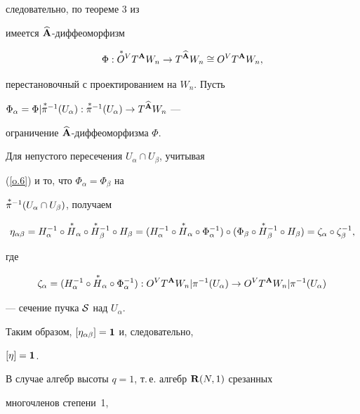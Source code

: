 \begin{pf}
следовательно, по теореме 3 из \cite{VSh35}


имеется $\widehat{{\bold A}}$-диффеоморфизм


$$


\Phi:{\puts O}{}^VT^\A W_n\to T^{\widehat \A} W_n\cong O^VT^\A W_n,


$$


перестановочный с проектированием на $W_n$. Пусть


$\Phi_\alpha=\Phi|{\puts \pi}{}^{-1}(U_\alpha):


{\puts \pi}{}^{-1}(U_\alpha)\to T^{\widehat \A} W_n$ ---


ограничение $\widehat{{\bold A}}$-диффеоморфизма $\Phi$.


Для непустого пересечения $U_\alpha\cap U_\beta$, учитывая


(\ref{o.6}) и то, что $\Phi_\alpha=\Phi_\beta$  на


${\overset{\,\ast}{\pi}{}}{}^{-1}(U_\alpha\cap U_\beta)$, получаем


$$


\eta_{\alpha\beta}=H^{-1}_\alpha\circ{\puts H}_\alpha


\circ{\puts H}{}_\beta^{-1}\circ H_\beta=


(H^{-1}_\alpha\circ{\puts H}_\alpha\circ\Phi^{-1}_\alpha)\circ


(\Phi_\beta\circ{\puts H}{}_\beta^{-1}\circ H_\beta)=


\zeta_\alpha\circ\zeta^{-1}_\beta,


$$


где


$$


\zeta_\alpha=(H^{-1}_\alpha\circ{\puts


H}_\alpha\circ\Phi^{-1}_\alpha):


O^VT^\A W_n|\pi^{-1}(U_\alpha)\to O^VT^\A W_n|\pi^{-1}(U_\alpha)


$$


--- сечение пучка $\cal S$ над $U_\alpha$.


Таким образом, $[\eta_{\alpha\beta}]={\bold 1}$ и, следовательно,


$[\eta]={\bold 1}$.


\end{pf}








В случае алгебр высоты $q=1$, т.\,е. алгебр ${\bold R}(N,1)$  срезанных


многочленов степени~1,


